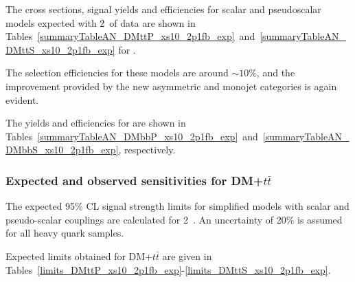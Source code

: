 The cross sections, signal yields and efficiencies for scalar and pseudoscalar
\DMtt models expected with 2~\ifb of data are shown in 
Tables~\ref{summaryTableAN_DMttP_xs10_2p1fb_exp}~and~\ref{summaryTableAN_DMttS_xs10_2p1fb_exp} for \DMtt. 

The selection efficiencies for these models are around $\sim 10$\%, and the improvement
provided by the new asymmetric and monojet categories is again evident.

\clearpage 

 
\clearpage


The yields and efficiencies for \DMbb are shown in Tables~\ref{summaryTableAN_DMbbP_xs10_2p1fb_exp}~and~\ref{summaryTableAN_DMbbS_xs10_2p1fb_exp}, respectively. 

 
\clearpage


\subsubsection{Expected and observed sensitivities for DM+$t\bar{t}$}

The expected 95\% CL signal strength limits for simplified \DMtt models with scalar and
pseudo-scalar couplings are calculated for 2~\ifb. An uncertainty of 20\% is assumed for all 
heavy quark samples.





\clearpage
Expected limits obtained for DM+$t\bar{t}$ are given in Tables~\ref{limits_DMttP_xs10_2p1fb_exp}-\ref{limits_DMttS_xs10_2p1fb_exp}.



%
%


